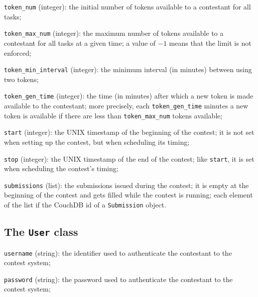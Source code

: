 \documentclass[a4paper,8pt]{amsart}
\newenvironment{squishlist}{%
  \begin{list}{\textbullet}%
    { \setlength{\itemsep}{0pt}%
      \setlength{\parsep}{3pt}%
      \setlength{\topsep}{3pt}%
      \setlength{\partopsep}{0pt}%
      \setlength{\leftmargin}{1.5em}%
      \setlength{\labelwidth}{1em}%
      \setlength{\labelsep}{0.5em} }%
}{\end{list}}
\newcommand{\id}[1]{\texttt{#1}}
\begin{document}
\begin{multicols}{2}
\begin{squishlist}
  \item \id{token\_num} (integer): the initial number of tokens
    available to a contestant for all tasks;

  \item \id{token\_max\_num} (integer): the maximum number of tokens
    available to a contestant for all tasks at a given time; a value
    of $-1$ means that the limit is not enforced;

  \item \id{token\_min\_interval} (integer): the minimum interval (in
    minutes) between using two tokens;

  \item \id{token\_gen\_time} (integer): the time (in minutes) after
    which a new token is made available to the contestant; more
    precisely, each \id{token\_gen\_time} minutes a new token is
    available if there are less than \id{token\_max\_num} tokens
    available;

  \item \id{start} (integer): the UNIX timestamp of the beginning
    of the contest; it is not set when setting up the contest, but when
    scheduling its timing;

  \item \id{stop} (integer): the UNIX timestamp of the end of the
    contest; like \id{start}, it is set when scheduling the contest's
    timing;

  \item \id{submissions} (list): the submissions issued during the
    contest; it is empty at the beginning of the contest and gets
    filled while the contest is running; each element of the list if
    the CouchDB id of a \id{Submission} object.

  \end{squishlist}

  \subsection{The \id{User} class}

  \begin{squishlist}

  \item \id{username} (string): the identifier used to authenticate
    the contestant to the contest system;

  \item \id{password} (string): the password used to authenticate the
    contestant to the contest system;


\end{squishlist}
\end{multicols}
\end{document}
